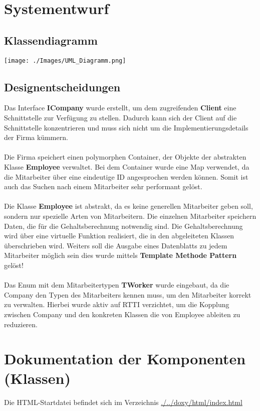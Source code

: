 \documentclass[12pt,naustrian,a4widepaper]{scrartcl}
\begin{document}
\clearpage
\section{Systementwurf}

\subsection{Klassendiagramm}
\texttt{[image: ./Images/UML\_Diagramm.png]}
\newpage

\subsection{Designentscheidungen}

Das Interface \textbf{ICompany} wurde erstellt, um dem zugreifenden \textbf{Client} eine Schnittstelle zur Verfügung zu stellen.
Dadurch kann sich der Client auf die Schnittstelle konzentrieren und muss sich nicht um die Implementierungsdetails der Firma kümmern.
\\
\\
Die Firma speichert einen polymorphen Container, der Objekte der abstrakten Klasse \textbf{Employee} verwaltet.
Bei dem Container wurde eine Map verwendet, da die Mitarbeiter über eine eindeutige ID angesprochen werden können.
Somit ist auch das Suchen nach einem Mitarbeiter sehr performant gelöst.
\\
\\
Die Klasse \textbf{Employee} ist abstrakt, da es keine generellen Mitarbeiter geben soll, sondern nur spezielle Arten von Mitarbeitern.
Die einzelnen Mitarbeiter speichern Daten, die für die Gehaltsberechnung notwendig sind. 
Die Gehaltsberechnung wird über eine virtuelle Funktion realisiert, die in den abgeleiteten Klassen überschrieben wird.
Weiters soll die Ausgabe eines Datenblatts zu jedem Mitarbeiter möglich sein dies wurde mittels \textbf{Template Methode Pattern} gelöst!
\\
\\
Das Enum mit dem Mitarbeitertypen \textbf{TWorker} wurde eingebaut, da die Company den Typen des Mitarbeiters kennen muss, um den Mitarbeiter korrekt zu verwalten.
Hierbei wurde aktiv auf RTTI verzichtet, um die Kopplung zwischen Company und den konkreten Klassen die von Employee ableiten zu reduzieren.

\color{black}

\section{Dokumentation der Komponenten (Klassen)}
Die HTML-Startdatei befindet sich im Verzeichnis \href{run:./../doxy/html/index.html}{./../doxy/html/index.html}
\end{document}
